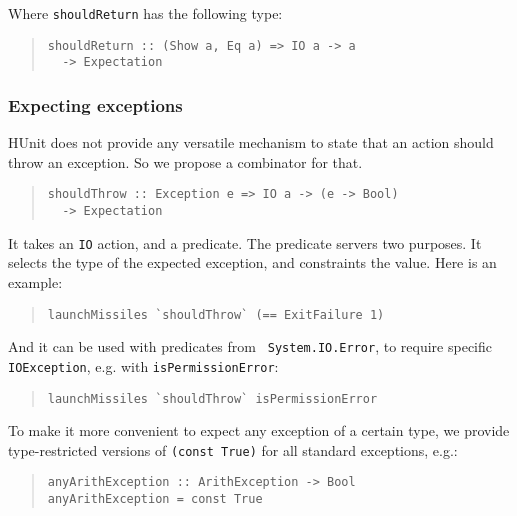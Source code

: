 \documentclass[preprint]{sigplanconf}
\begin{document}
\noindent Where \verb|shouldReturn| has the following type:

\begin{quote}
\small
\begin{verbatim}
shouldReturn :: (Show a, Eq a) => IO a -> a
  -> Expectation
\end{verbatim}
\end{quote}


\subsubsection{Expecting exceptions}
\label{sec:expacting-exceptions}

HUnit does not provide any versatile mechanism to state that an action
should throw an exception.  So we propose a combinator for that.

\begin{quote}
\small
\begin{verbatim}
shouldThrow :: Exception e => IO a -> (e -> Bool)
  -> Expectation
\end{verbatim}
\end{quote}

\noindent It takes an {\tt IO} action, and a predicate.  The predicate
servers two purposes.  It selects the type of the expected exception,
and constraints the value.  Here is an example:

\begin{quote}
\small
\begin{verbatim}
launchMissiles `shouldThrow` (== ExitFailure 1)
\end{verbatim}
\end{quote}

\noindent And it can be used with predicates from {\tt
System.IO.Error}, to require specific {\tt IOException}, e.g.  with
{\tt isPermissionError}:

\begin{quote}
\small
\begin{verbatim}
launchMissiles `shouldThrow` isPermissionError
\end{verbatim}
\end{quote}

\noindent To make it more convenient to expect any exception of a
certain type, we provide type-restricted versions of {\tt (const
True)} for all standard exceptions, e.g.:

\begin{quote}
\small
\begin{verbatim}
anyArithException :: ArithException -> Bool
anyArithException = const True
\end{verbatim}
\end{quote}
\end{document}
